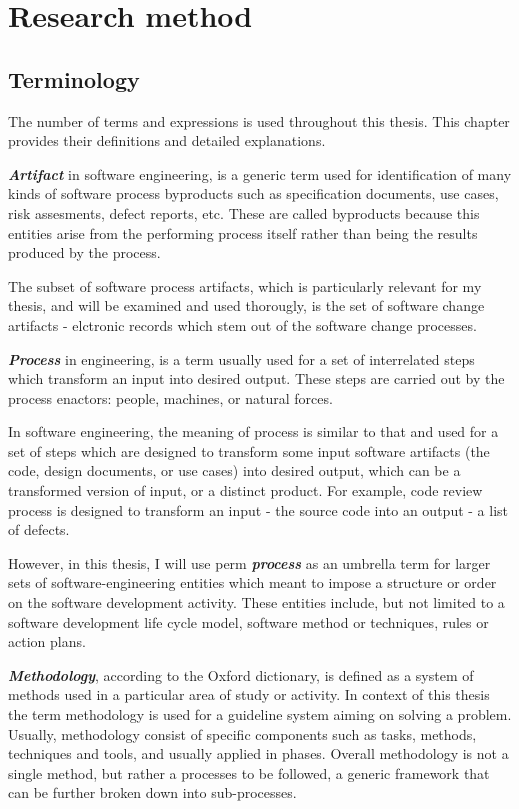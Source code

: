 \chapter{Research method}

\section{Terminology}\label{definitions}
The number of terms and expressions is used throughout this thesis. This chapter provides
their definitions and detailed explanations.

\textit{\textbf{Artifact}} in software engineering, is a generic term used for identification
of many kinds of software process byproducts such as specification documents, use cases, 
risk assesments, defect reports, etc. These are called byproducts because this entities
arise from the performing process itself rather than being the results produced by the process.

The subset of software process artifacts, which is particularly relevant for my thesis, 
and will be examined and used thorougly, is the set of software change artifacts - 
elctronic records which stem out of the software change processes.

\textit{\textbf{Process}} in engineering, is a term usually used for a set of interrelated 
steps which transform an input into desired output. These steps are carried out by the process
enactors: people, machines, or natural forces. 

In software engineering, the meaning of process is similar to that and used for a set of steps 
which are designed to transform some input software artifacts (the code, design documents, 
or use cases) into desired output, which can be a transformed version of input, or a
distinct product. For example, code review process is designed to transform an input - the 
source code into an output - a list of defects.

However, in this thesis, I will use perm \textit{\textbf{process}} as an umbrella term for 
larger sets of software-engineering entities which meant to impose a structure or order on
the software development activity. These entities include, but not limited to a software 
development life cycle model, software method or techniques, rules or action plans. 

\textit{\textbf{Methodology}}, according to the Oxford dictionary, is defined as a system of 
methods used in a particular area of study or activity. In context of this thesis the 
term methodology is used for a guideline system aiming on solving a problem. Usually, 
methodology consist of specific components such as tasks, methods, techniques and tools, 
and usually applied in phases. Overall methodology is not a single method, but rather 
a processes to be followed, a generic framework that can be further broken down into 
sub-processes.

